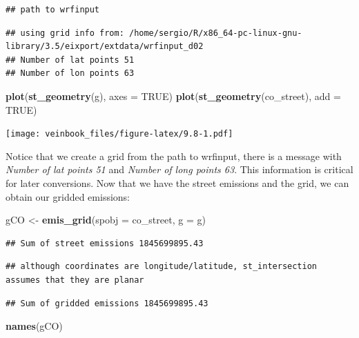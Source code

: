 \documentclass[12pt,graybox,envcountchap,sectrefs]{krantz}
\makeatletter
\newenvironment{Shaded}{\begin{snugshade}}{\end{snugshade}}
\newcommand{\KeywordTok}[1]{\textcolor[rgb]{0.13,0.29,0.53}{\textbf{#1}}}
\newcommand{\DataTypeTok}[1]{\textcolor[rgb]{0.13,0.29,0.53}{#1}}
\newcommand{\StringTok}[1]{\textcolor[rgb]{0.31,0.60,0.02}{#1}}
\newcommand{\OtherTok}[1]{\textcolor[rgb]{0.56,0.35,0.01}{#1}}
\newcommand{\NormalTok}[1]{#1}
\newenvironment{kframe}{%
\medskip{}
\setlength{\fboxsep}{.8em}
 \def\at@end@of@kframe{}%
 \ifinner\ifhmode%
  \def\at@end@of@kframe{\end{minipage}}%
  \begin{minipage}{\columnwidth}%
 \fi\fi%
 \def\FrameCommand##1{\hskip\@totalleftmargin \hskip-\fboxsep
 \colorbox{shadecolor}{##1}\hskip-\fboxsep
     \hskip-\linewidth \hskip-\@totalleftmargin \hskip\columnwidth}%
 \MakeFramed {\advance\hsize-\width
   \@totalleftmargin\z@ \linewidth\hsize
   \@setminipage}}%
 {\par\unskip\endMakeFramed%
 \at@end@of@kframe}
\renewenvironment{Shaded}{\begin{kframe}}{\end{kframe}}
\theoremstyle{definition}
\theoremstyle{definition}
\theoremstyle{definition}
\theoremstyle{remark}
\makeatother
\begin{document}
\begin{verbatim}
## path to wrfinput
\end{verbatim}

\begin{verbatim}
## using grid info from: /home/sergio/R/x86_64-pc-linux-gnu-library/3.5/eixport/extdata/wrfinput_d02 
## Number of lat points 51
## Number of lon points 63
\end{verbatim}

\begin{Shaded}
\begin{Highlighting}[]
\KeywordTok{plot}\NormalTok{(}\KeywordTok{st_geometry}\NormalTok{(g), }\DataTypeTok{axes =} \OtherTok{TRUE}\NormalTok{)}
\KeywordTok{plot}\NormalTok{(}\KeywordTok{st_geometry}\NormalTok{(co_street), }\DataTypeTok{add =} \OtherTok{TRUE}\NormalTok{)}
\end{Highlighting}
\end{Shaded}

\texttt{[image: veinbook\_files/figure-latex/9.8-1.pdf]}

Notice that we create a grid from the path to wrfinput, there is a
message with \emph{Number of lat points 51} and \emph{Number of long
points 63}. This information is critical for later conversions. Now that
we have the street emissions and the grid, we can obtain our gridded
emissions:

\begin{Shaded}
\begin{Highlighting}[]
\NormalTok{gCO <-}\StringTok{ }\KeywordTok{emis_grid}\NormalTok{(}\DataTypeTok{spobj =}\NormalTok{ co_street, }\DataTypeTok{g =}\NormalTok{ g)}
\end{Highlighting}
\end{Shaded}

\begin{verbatim}
## Sum of street emissions 1845699895.43
\end{verbatim}

\begin{verbatim}
## although coordinates are longitude/latitude, st_intersection assumes that they are planar
\end{verbatim}

\begin{verbatim}
## Sum of gridded emissions 1845699895.43
\end{verbatim}

\begin{Shaded}
\begin{Highlighting}[]
\KeywordTok{names}\NormalTok{(gCO)}
\end{Highlighting}
\end{Shaded}
\end{document}

